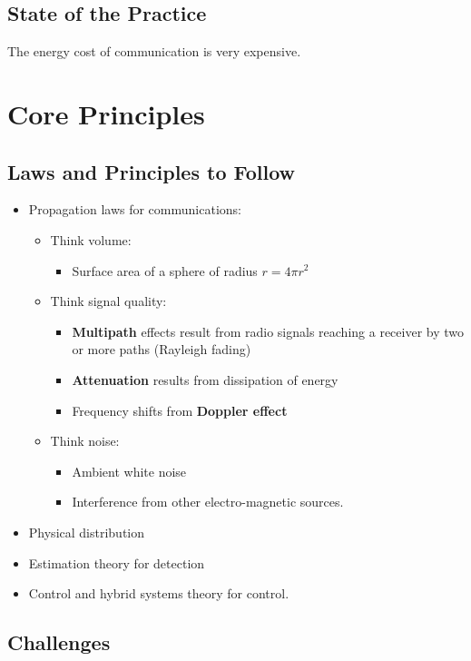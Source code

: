 \documentclass[letterpaper,10pt]{article}
\begin{document}
\subsection{State of the Practice}

The energy cost of communication is very expensive.

\section{Core Principles}

\subsection{Laws and Principles to Follow}

\begin{itemize}
	\item Propagation laws for communications:
	\begin{itemize}
		\item Think volume:
		\begin{itemize}
			\item Surface area of a sphere of radius $r=4\pi r^2$
		\end{itemize}
		\item Think signal quality:
		\begin{itemize}
			\item \textbf{Multipath} effects result from radio signals reaching a receiver by two or more paths (Rayleigh fading)
			\item \textbf{Attenuation} results from dissipation of energy
			\item Frequency shifts from \textbf{Doppler effect}
		\end{itemize}
		\item Think noise:
		\begin{itemize}
			\item Ambient white noise
			\item Interference from other electro-magnetic sources.
		\end{itemize}
	\end{itemize}
	\item Physical distribution
	\item Estimation theory for detection
	\item Control and hybrid systems theory for control.
\end{itemize}

\subsection{Challenges}
\end{document}

